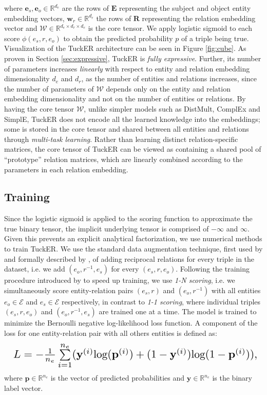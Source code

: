 \documentclass[11pt,a4paper]{article}
\begin{document}
where $\mathbf{e}_s, \mathbf{e}_o \in \mathbb{R}^{d_e}$ are the rows of $\mathbf{E}$ representing the subject and object entity embedding vectors, $\mathbf{w}_r \in \mathbb{R}^{d_r}$ the rows of $\mathbf{R}$ representing the relation embedding vector and $\mathcal{W} \in \mathbb{R}^{d_e \times d_r \times d_e}$ is the core tensor. We apply logistic sigmoid to each score $\phi(e_s, r, e_o)$ to obtain the predicted probability $p$ of a triple being true. Visualization of the TuckER architecture can be seen in Figure \ref{fig:cube}. As proven in Section \ref{sec:expressive}, TuckER is \textit{fully expressive}. Further, its number of parameters increases \emph{linearly} with respect to entity and relation embedding dimensionality $d_e$ and $d_r$, as the number of entities and relations increases, since the number of parameters of $\mathcal{W}$ depends only on the entity and relation embedding dimensionality and not on the number of entities or relations. By having the core tensor $\mathcal{W}$, unlike simpler models such as DistMult, ComplEx and SimplE, TuckER does not encode all the learned knowledge into the embeddings; some is stored in the core tensor and shared between all entities and relations through \textit{multi-task learning}. Rather than learning distinct relation-specific matrices, the core tensor of TuckER can be viewed as containing a shared pool of ``prototype'' relation matrices, which are linearly combined according to the parameters in each relation embedding. 

\subsection{Training}

Since the logistic sigmoid is applied to the scoring function to approximate the true binary tensor, the implicit underlying tensor is comprised of $-\infty$ and $\infty$. Given this prevents an explicit analytical factorization, we use numerical methods to train TuckER. We use the standard data augmentation technique, first used by \citet{dettmers2018convolutional} and formally described by \citet{lacroix2018canonical}, of adding reciprocal relations for every triple in the dataset, i.e. we add $(e_o, r^{-1}, e_s)$ for every $(e_s, r, e_o)$. Following the training procedure introduced by \citet{dettmers2018convolutional} to speed up training, we use \textit{1-N scoring}, i.e. we simultaneously score entity-relation pairs $(e_s, r)$ and $(e_o, r^{-1})$ with all entities $e_o \in \mathcal{E}$ and $e_s \in \mathcal{E}$ respectively, in contrast to \textit{1-1 scoring}, where individual triples $(e_s, r, e_o)$ and $(e_o, r^{-1}, e_s)$ are trained one at a time. The model is trained to minimize the Bernoulli negative log-likelihood loss function. A component of the loss for one entity-relation pair with all others entities is defined as:
\begin{equation}
\resizebox{\hsize}{!}{
$L = -\frac{1}{n_e}\sum\limits_{i=1}^{n_e} (\mathbf{y}^{(i)} \text{log}(\mathbf{p}^{(i)}) + (1-\mathbf{y}^{(i)}) \text{log}(1-\mathbf{p}^{(i)})),$}
\end{equation}
where $\mathbf{p} \in \mathbb{R}^{n_e}$ is the vector of predicted probabilities and $\mathbf{y} \in \mathbb{R}^{n_e}$ is the binary label vector.
\end{document}
